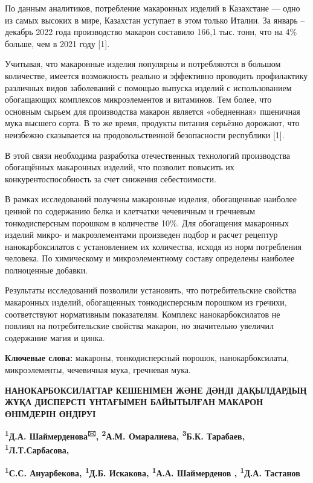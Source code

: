 По данным аналитиков, потребление макаронных изделий в Казахстане ---
одно из самых высоких в мире, Казахстан уступает в этом только Италии.
За январь -- декабрь 2022 года производство макарон составило 166,1 тыс.
тонн, что на 4\% больше, чем в 2021 году {[}1{]}.

Учитывая, что макаронные изделия популярны и потребляются в большом
количестве, имеется возможность реально и эффективно проводить
профилактику различных видов заболеваний с помощью выпуска изделий с
использованием обогащающих комплексов микроэлементов и витаминов. Тем
более, что основным сырьем для производства макарон является
«обедненная» пшеничная мука высшего сорта. В то же время, продукты
питания серьёзно дорожают, что неизбежно сказывается на
продовольственной безопасности республики {[}1{]}.

В этой связи необходима разработка отечественных технологий производства
обогащённых макаронных изделий, что позволит повысить их
конкурентоспособность за счет снижения себестоимости.

В рамках исследований получены макаронные изделия, обогащенные наиболее
ценной по содержанию белка и клетчатки чечевичным и гречневым
тонкодисперсным порошком в количестве 10\%. Для обогащения макаронных
изделий микро- и макроэлементами произведен подбор и расчет рецептур
нанокарбоксилатов с установлением их количества, исходя из норм
потребления человека. По химическому и микроэлементному составу
определены наиболее полноценные добавки.

Результаты исследований позволили установить, что потребительские
свойства макаронных изделий, обогащенных тонкодисперсным порошком из
гречихи, соответствуют нормативным показателям. Комплекс
нанокарбоксилатов не повлиял на потребительские свойства макарон, но
значительно увеличил содержание магия и цинка.

{\bfseries Ключевые слова:} макароны, тонкодисперсный порошок,
нанокарбоксилаты, микроэлементы, чечевичная мука, гречневая мука.

{\bfseries НАНОКАРБОКСИЛАТТАР КЕШЕНІМЕН ЖӘНЕ ДӘНДІ ДАҚЫЛДАРДЫҢ ЖҰҚА
ДИСПЕРСТІ ҰНТАҒЫМЕН БАЙЫТЫЛҒАН МАКАРОН ӨНІМДЕРІН ӨНДІРУІ}

{\bfseries \textsuperscript{1}Д.А. Шаймерденова\textsuperscript{🖂},
\textsuperscript{2}А.М. Омаралиева, \textsuperscript{3}Б.К. Тарабаев,
\textsuperscript{1}Л.Т.Сарбасова,}

{\bfseries \textsuperscript{1}С.С. Ануарбекова, \textsuperscript{1}Д.Б.
Искакова, \textsuperscript{1}А.А. Шаймерденов , \textsuperscript{1}Д.А.
Тастанов}

